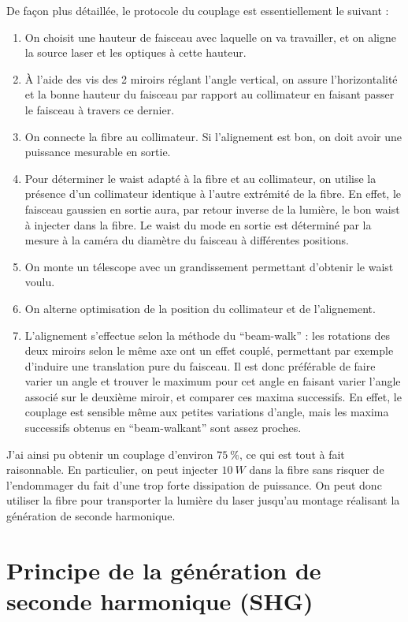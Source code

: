 \documentclass[11pt,a4paper]{article}
\begin{document}
De façon plus détaillée, le protocole du couplage est essentiellement le suivant :
\begin{enumerate}
	\item On choisit une hauteur de faisceau avec laquelle on va travailler, et on aligne la source laser et les optiques à cette hauteur.
	\item À l'aide des vis des 2 miroirs réglant l'angle vertical, on assure l'horizontalité et la bonne hauteur du faisceau par rapport au collimateur en faisant passer le faisceau à travers ce dernier.
	\item On connecte la fibre au collimateur. Si l'alignement est bon, on doit avoir une puissance mesurable en sortie.
	\item Pour déterminer le waist adapté à la fibre et au collimateur, on utilise la présence d'un collimateur identique à l'autre extrémité de la fibre. En effet, le faisceau gaussien en sortie aura, par retour inverse de la lumière, le bon waist à injecter dans la fibre. Le waist du mode en sortie est déterminé par la mesure à la caméra du diamètre du faisceau à différentes positions.	
	\item On monte un télescope avec un grandissement permettant d'obtenir le waist voulu.
	\item On alterne optimisation de la position du collimateur et de l'alignement.
	\item L'alignement s'effectue selon la méthode du ``beam-walk'' : les rotations des deux miroirs selon le même axe ont un effet couplé, permettant par exemple d'induire une translation pure du faisceau. Il est donc préférable de faire varier un angle et trouver le maximum pour cet angle en faisant varier l'angle associé sur le deuxième miroir, et comparer ces maxima successifs. En effet, le couplage est sensible même aux petites variations d'angle, mais les maxima successifs obtenus en ``beam-walkant'' sont assez proches. 
\end{enumerate}

J'ai ainsi pu obtenir un couplage d'environ $\SI{75}{\percent}$, ce qui est tout à fait raisonnable. En particulier, on peut injecter $\SI{10}{W}$ dans la fibre sans risquer de l'endommager du fait d'une trop forte dissipation de puissance. On peut donc utiliser la fibre pour transporter la lumière du laser jusqu'au montage réalisant la génération de seconde harmonique.



\section{Principe de la génération de seconde harmonique (SHG)} %
\label{SHG}
\end{document}
